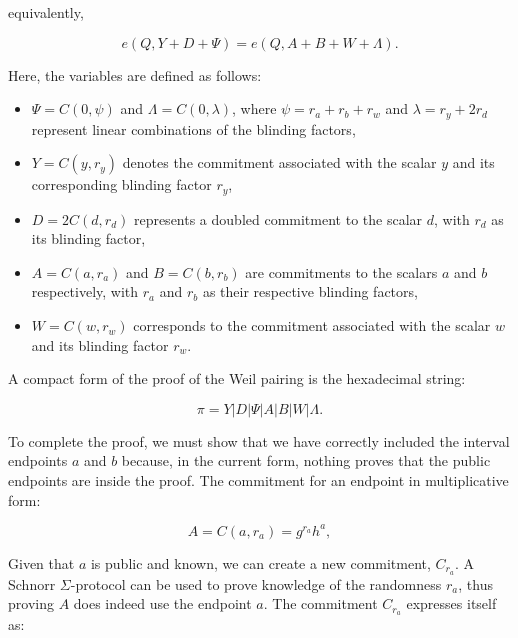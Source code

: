 \documentclass{iacrcc}
\theoremstyle{definition}
\begin{document}
equivalently,

\begin{equation}
  e(Q, Y + D + \Psi) = e(Q, A + B + W + \Lambda).
  \end{equation}

Here, the variables are defined as follows:

\begin{itemize}
    \item \( \Psi = C(0, \psi) \) and \( \Lambda = C(0, \lambda) \), where \( \psi = r_{a} + r_{b} + r_{w} \) and \( \lambda = r_{y} + 2r_{d} \) represent linear combinations of the blinding factors,
    \item \( Y = C(y, r_{y}) \) denotes the commitment associated with the scalar \( y \) and its corresponding blinding factor \( r_{y} \),
    \item \( D = 2C(d, r_{d}) \) represents a doubled commitment to the scalar \( d \), with \( r_{d} \) as its blinding factor,
    \item \( A = C(a, r_{a}) \) and \( B = C(b, r_{b}) \) are commitments to the scalars \( a \) and \( b \) respectively, with \( r_{a} \) and \( r_{b} \) as their respective blinding factors,
    \item \( W = C(w, r_{w}) \) corresponds to the commitment associated with the scalar \( w \) and its blinding factor \( r_{w} \).
\end{itemize}

A compact form of the proof of the Weil pairing is the hexadecimal string:

\begin{equation}
\pi = Y | D | \Psi | A | B | W | \Lambda.
\end{equation}

To complete the proof, we must show that we have correctly included the interval endpoints \( a \) and \( b \) because, in the current form, nothing proves that the public endpoints are inside the proof. The commitment for an endpoint in multiplicative form:

\begin{equation}
A = C(a, r_{a}) = g^{r_{a}} h^{a},
\end{equation}

Given that \( a \) is public and known, we can create a new commitment, \( C_{r_a} \). A Schnorr $\Sigma$-protocol can be used to prove knowledge of the randomness \( r_a \), thus proving $A$ does indeed use the endpoint \(a\). The commitment \( C_{r_a} \) expresses itself as:
\end{document}
